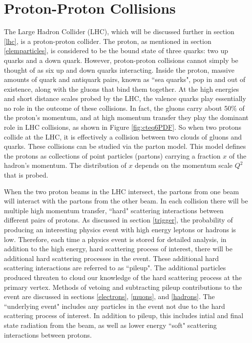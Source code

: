 \documentclass[oneside, letterpaper, oldfontcommands]{memoir}
\begin{document}
\section{Proton-Proton Collisions}\label{ppcoll}
\qquad The Large Hadron Collider (LHC), which will be discussed further in section \ref{lhc}, is a proton-proton collider. The proton, as mentioned in section \ref{elemparticles}, is considered to be the bound state of three quarks: two up quarks and a down quark. However, proton-proton collisions cannot simply be thought of as six up and down quarks interacting. Inside the proton, massive amounts of quark and antiquark pairs, known as ``sea quarks", pop in and out of existence, along with the gluons that bind them together. At the high energies and short distance scales probed by the LHC, the valence quarks play essentially no role in the outcome of these collisions. In fact, the gluons carry about 50$\%$ of the proton's momentum\cite{Halzen:1984mc}, and at high momentum transfer they play the dominant role in LHC collisions, as shown in Figure \ref{fig:cteq6PDF}. So when two protons collide at the LHC, it is effectively a collision between two clouds of gluons and quarks. These collisions can be studied via the parton model. This model defines the protons as collections of point particles (partons) carrying a fraction $x$ of the hadron's momentum. The distribution of $x$ depends on the momentum scale $Q^{2}$ that is probed. 

\qquad When the two proton beams in the LHC intersect, the partons from one beam will interact with the partons from the other beam. In each collision there will be multiple high momentum transfer, ``hard" scattering interactions between different pairs of protons. As discussed in section \ref{trigger}, the probability of producing an interesting physics event with high energy leptons or hadrons is low. Therefore, each time a physics event is stored for detailed analysis, in addition to the high energy, hard scattering process of interest, there will be additional hard scattering processes in the event. These additional hard scattering interactions are referred to as ``pileup". The additional particles produced threaten to cloud our knowledge of the hard scattering process at the primary vertex. Methods of vetoing and subtracting pileup contributions to the event are discussed in sections \ref{electrons}, \ref{muons}, and \ref{hadrons}. The ``underlying event" includes any particles in the event not due to the hard scattering process of interest. In addition to pileup, this includes intial and final state radiation from the beam, as well as lower energy ``soft" scattering interactions between protons. 
\end{document}
